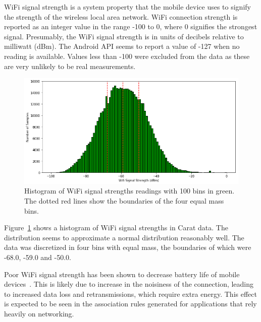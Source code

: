 WiFi signal strength is a system property that the mobile device uses to signify the strength of the wireless local area network. WiFi connection strength is reported as an integer value in the range -100 to 0, where 0 signifies the strongest signal. Presumably, the WiFi signal strength is in units of decibels relative to milliwatt (dBm). The Android API seems to report a value of -127 when no reading is available. Values less than -100 were excluded from the data as these are very unlikely to be real measurements.

\begin{figure} %
	\centering
	\includegraphics[width=\textwidth]{images/carat-data/wifi_signal_strength_w_boundaries.png}
	\caption{Histogram of WiFi signal strengths readings with 100 bins in green. The dotted red lines show the boundaries of the four equal mass bins.}
	\label{figure:carat-data-wifi-signal-strength}
\end{figure} 

Figure~\ref{figure:carat-data-wifi-signal-strength} shows a histogram of WiFi signal strengths in Carat data. The distribution seems to approximate a normal distribution reasonably well. The data was discretized in four bins with equal mass, the boundaries of which were -68.0, -59.0 and -50.0.

Poor WiFi signal strength has been shown to decrease battery life of mobile devices~\cite{7146507}. This is likely due to increase in the noisiness of the connection, leading to increased data loss and retransmissions, which require extra energy. This effect is expected to be seen in the association rules generated for applications that rely heavily on networking.

